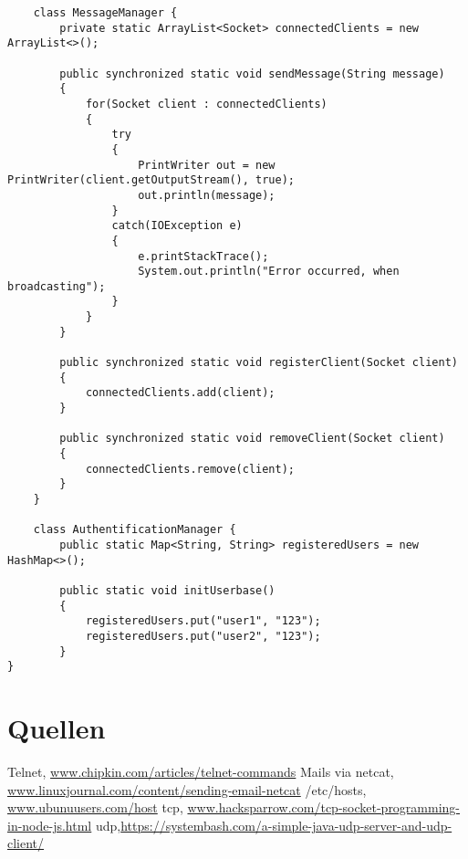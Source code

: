 \documentclass[12pt]{article}
\theoremstyle{plain}
\begin{document}
\begin{lstlisting}
	class MessageManager {
		private static ArrayList<Socket> connectedClients = new ArrayList<>();

		public synchronized static void sendMessage(String message)
		{
			for(Socket client : connectedClients)
			{
				try
				{
					PrintWriter out = new PrintWriter(client.getOutputStream(), true);
					out.println(message);
				}
				catch(IOException e)
				{
					e.printStackTrace();
					System.out.println("Error occurred, when broadcasting");
				}
			}
		}

		public synchronized static void registerClient(Socket client)
		{
			connectedClients.add(client);
		}

		public synchronized static void removeClient(Socket client)
		{
			connectedClients.remove(client);
		}
	}

	class AuthentificationManager {
		public static Map<String, String> registeredUsers = new HashMap<>();

		public static void initUserbase()
		{
			registeredUsers.put("user1", "123");
			registeredUsers.put("user2", "123");
		}
}
\end{lstlisting}
\section{Quellen}
\begin{thebibliography}{50}
 Telnet, \url{www.chipkin.com/articles/telnet-commands}	
 Mails via netcat, \url{www.linuxjournal.com/content/sending-email-netcat}	
 /etc/hosts, \url{www.ubunuusers.com/host}	
 tcp, \url{www.hacksparrow.com/tcp-socket-programming-in-node-js.html}	
udp,\url{https://systembash.com/a-simple-java-udp-server-and-udp-client/}	
\end{thebibliography}
\end{document}
